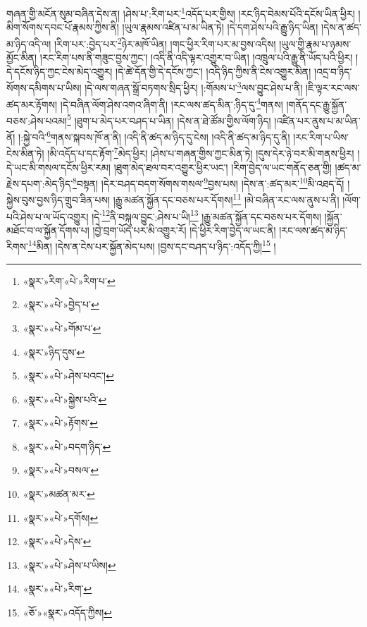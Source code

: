 གཞན་གྱི་མངོན་སུམ་བཞིན་དེས་ན། །ཤེས་པ་:རིག་པར་\footnote{«སྣར་»རིག་«པེ་»རིག་པ་}འདོད་པར་གྱིས། །རང་ཉིད་བེམས་པོའི་དངོས་ཡིན་ཕྱིར། །མིག་སོགས་དབང་པོ་རྣམས་ཀྱིས་ནི། །ཡུལ་རྣམས་འཛིན་པ་མ་ཡིན་ཏེ། །དེ་དག་ཤེས་པའི་རྒྱུ་ཉིད་ཡིན། །དེས་ན་ཚད་མ་ཉིད་འདི་ལ། །རིག་པར་:བྱེད་པར་\footnote{«སྣར་»«པེ་»བྱེད་པ་}ཉེར་མཁོ་ཡིན། །གང་ཕྱིར་རིག་པར་མ་བྱས་འདིས། །ཡུལ་གྱི་རྣམ་པ་ཉམས་མྱོང་མིན། །རང་རིག་པས་ནི་གཟུང་བྱས་ཀྱང་། །འདི་ནི་འདི་ལྟར་འགྱུར་བ་ཡིན། །འཁྲུལ་པའི་རྒྱུ་ནི་ཡོད་པའི་ཕྱིར། །དེ་དངོས་ཉིད་ཀྱང་ངེས་མེད་འགྱུར། །དེ་ཚེ་དོན་གྱི་དེ་དངོས་ཀྱང་། །འདི་ཉིད་ཀྱིས་ནི་ངེས་འགྱུར་མིན། །འདྲ་བ་ཉིད་སོགས་དམིགས་པ་ཡིས། །དེ་ལས་གཞན་སྒྲོ་བཏགས་སྲིད་ཕྱིར། །:གོམས་པ་\footnote{«སྣར་»«པེ་»གོམ་པ་}ལས་བྱུང་ཤེས་པ་ནི། །ཇི་ལྟར་རང་ལས་ཚད་མར་རྟོགས། །དེ་བཞིན་ལོག་ཤེས་འགའ་ཞིག་ནི། །རང་ལས་ཚད་མིན་:ཉིད་དུ་\footnote{«སྣར་»ཉིད་དུས་}གནས། །གནོད་དང་རྒྱུ་སྐྱོན་བཅས་:ཤེས་པའམ།\footnote{«སྣར་»«པེ་»ཤེས་པའང་།} །ཐུག་པ་མེད་པར་བཤད་པ་ཡིན། །དེས་ན་ཐེ་ཚོམ་གྱིས་ལོག་ཉིད། །འཛིན་པར་ནུས་པ་མ་ཡིན་ནོ། །:སྐྱེ་བའི་\footnote{«སྣར་»«པེ་»སྐྱེས་པའི་}གནས་སྐབས་ཁོ་ན་ནི། །འདི་ནི་ཚད་མ་ཉིད་དུ་ངེས། །འདི་ནི་ཚད་མ་ཉིད་དུ་ནི། །རང་རིག་པ་ཡིས་ངེས་མིན་ཏེ། །མི་འདོད་པ་དང་རྟོག་\footnote{«སྣར་»«པེ་»རྟོགས་}མེད་ཕྱིར། །ཤེས་པ་གཞན་གྱིས་ཀྱང་མིན་ཏེ། །དུས་དེར་ཉེ་བར་མི་གནས་ཕྱིར། །དེ་ཡང་མི་གསལ་དངོས་ཕྱིར་རམ། །ཐུག་མེད་ཐལ་བར་འགྱུར་ཕྱིར་ཡང་། །རིག་བྱེད་ལ་ཡང་གནོད་ཅན་གྱི། །ཚད་མ་རྗེས་དཔག་:མེད་ཉིད་\footnote{«སྣར་»«པེ་»བདག་ཉིད་}བསྟན། །དེར་བཤད་བདག་སོགས་གསལ་\footnote{«སྣར་»«པེ་»བསལ་}བྱས་པས། །དེས་ན་:ཚད་མར་\footnote{«སྣར་»མཚན་མར་}མི་འཐད་དོ། །སྐྱེས་བུས་བྱས་ཉིད་གྲུབ་ཟིན་པས། །རྒྱུ་མཚན་སྐྱོན་དང་བཅས་པར་དོགས།\footnote{«སྣར་»«པེ་»དགོས།} །མེ་བཞིན་རང་ལས་ནུས་པ་ནི། །ལོག་པའི་ཤེས་པ་ལ་ཡོད་འགྱུར། །དེ་\footnote{«སྣར་»«པེ་»དེས་}ནི་བསྐུལ་བྱུང་:ཤེས་པ་ཡི།\footnote{«སྣར་»«པེ་»ཤེས་པ་ཡིས།} །རྒྱུ་མཚན་སྐྱོན་དང་བཅས་པར་དོགས། །སྐྱོན་མཐོང་བ་ལ་སྐྱོན་དོགས་པ། །བྱེ་བྲག་ཡོད་པར་མི་འགྱུར་རོ། །དེ་ཕྱིར་རིག་བྱེད་ལ་ཡང་ནི། །རང་ལས་ཚད་མ་ཉིད་རིགས་\footnote{«སྣར་»«པེ་»རིག་}མིན། །དེས་ན་ངེས་པར་སྐྱོན་མེད་པས། །བྱས་དང་བཤད་པ་ཉིད་:འདོད་ཀྱི།\footnote{«ཅོ་»«སྣར་»འདོད་ཀྱིས།} །
